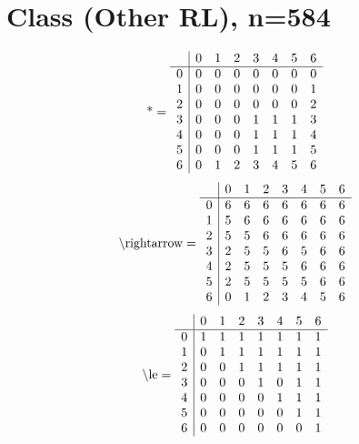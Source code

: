 \documentclass[11pt]{article}
\begin{document}
\section{Class (Other RL), n=584}
\[\text{*} = 
\begin{array}{r | r r r r r r r}
 & 0 & 1 & 2 & 3 & 4 & 5 & 6 \\ \hline
0 & 0 & 0 & 0 & 0 & 0 & 0 & 0 \\
1 & 0 & 0 & 0 & 0 & 0 & 0 & 1 \\
2 & 0 & 0 & 0 & 0 & 0 & 0 & 2 \\
3 & 0 & 0 & 0 & 1 & 1 & 1 & 3 \\
4 & 0 & 0 & 0 & 1 & 1 & 1 & 4 \\
5 & 0 & 0 & 0 & 1 & 1 & 1 & 5 \\
6 & 0 & 1 & 2 & 3 & 4 & 5 & 6 \\
\end{array}
\]
\[\text{\textbackslash rightarrow} = 
\begin{array}{r | r r r r r r r}
 & 0 & 1 & 2 & 3 & 4 & 5 & 6 \\ \hline
0 & 6 & 6 & 6 & 6 & 6 & 6 & 6 \\
1 & 5 & 6 & 6 & 6 & 6 & 6 & 6 \\
2 & 5 & 5 & 6 & 6 & 6 & 6 & 6 \\
3 & 2 & 5 & 5 & 6 & 5 & 6 & 6 \\
4 & 2 & 5 & 5 & 5 & 6 & 6 & 6 \\
5 & 2 & 5 & 5 & 5 & 5 & 6 & 6 \\
6 & 0 & 1 & 2 & 3 & 4 & 5 & 6 \\
\end{array}
\]
\[\text{\textbackslash le} = 
\begin{array}{r | r r r r r r r}
 & 0 & 1 & 2 & 3 & 4 & 5 & 6 \\ \hline
0 & 1 & 1 & 1 & 1 & 1 & 1 & 1 \\
1 & 0 & 1 & 1 & 1 & 1 & 1 & 1 \\
2 & 0 & 0 & 1 & 1 & 1 & 1 & 1 \\
3 & 0 & 0 & 0 & 1 & 0 & 1 & 1 \\
4 & 0 & 0 & 0 & 0 & 1 & 1 & 1 \\
5 & 0 & 0 & 0 & 0 & 0 & 1 & 1 \\
6 & 0 & 0 & 0 & 0 & 0 & 0 & 1 \\
\end{array}
\]
\end{document}
